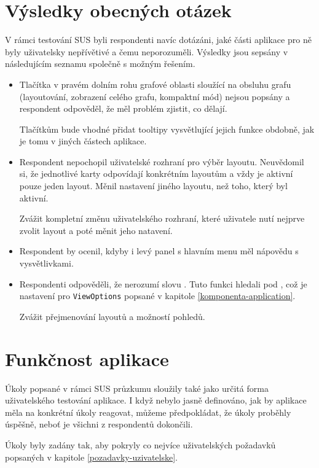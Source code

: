 \newpage


\section{Výsledky obecných otázek}
V rámci testování SUS byli respondenti navíc dotázáni, jaké části aplikace pro ně byly uživatelsky nepřívětivé a čemu neporozuměli. Výsledky jsou sepsány v následujícím seznamu společně s možným řešením.

\begin{itemize}
    \item Tlačítka v pravém dolním rohu grafové oblasti sloužící na obsluhu grafu (layoutování, zobrazení celého grafu, kompaktní mód) nejsou popsány a respondent odpověděl, že měl problém zjistit, co dělají.

    Tlačítkům bude vhodné přidat tooltipy vysvětlující jejich funkce obdobně, jak je tomu v jiných částech aplikace.
    \item Respondent nepochopil uživatelské rozhraní pro výběr layoutu. Neuvědomil si, že jednotlivé karty odpovídají konkrétním layoutům a vždy je aktivní pouze jeden layout. Měnil nastavení jiného layoutu, než toho, který byl aktivní.

    Zvážit kompletní změnu uživatelského rozhraní, které uživatele nutí nejprve zvolit layout a poté měnit jeho natavení.
    \item Respondent by ocenil, kdyby i levý panel s hlavním menu měl nápovědu s vysvětlivkami.
    \item Respondenti odpověděli, že nerozumí slovu . Tuto funkci hledali pod , což je nastavení pro \texttt{ViewOptions} popsané v kapitole \ref{komponenta-application}.

    Zvážit přejmenování layoutů a možností pohledů.
\end{itemize}

\section{Funkčnost aplikace}

Úkoly popsané v rámci SUS průzkumu sloužily také jako určitá forma uživatelského testování aplikace. I když nebylo jasně definováno, jak by aplikace měla na konkrétní úkoly reagovat, můžeme předpokládat, že úkoly proběhly úspěšně, neboť je všichni z respondentů dokončili.

Úkoly byly zadány tak, aby pokryly co nejvíce uživatelských požadavků popsaných v kapitole \ref{pozadavky-uzivatelske}.


